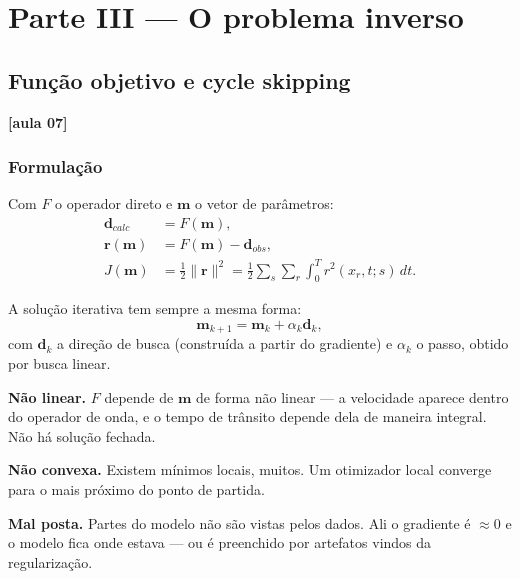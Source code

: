 \documentclass[11pt,a4paper,oneside]{report}
\newcommand{\aula}[1]{\textcolor{cianofwi}{\textbf{[aula #1]}}}
\begin{document}
\part*{\centering\color{azulfwi} Parte III --- O problema inverso}

\chapter{Função objetivo e cycle skipping}
\label{cap:inverso}

\aula{07}

\section{Formulação}

Com $F$ o operador direto e $\mathbf{m}$ o vetor de parâmetros:
\begin{align}
\mathbf{d}_{calc} &= F(\mathbf{m}), \\
\mathbf{r}(\mathbf{m}) &= F(\mathbf{m}) - \mathbf{d}_{obs}, \\
J(\mathbf{m}) &= \tfrac{1}{2}\|\mathbf{r}\|^{2}
 = \tfrac{1}{2}\sum_{s}\sum_{r}\int_{0}^{T} r^{2}(x_r,t;s)\,dt .
\end{align}

A solução iterativa tem sempre a mesma forma:
\begin{equation}
\mathbf{m}_{k+1} = \mathbf{m}_{k} + \alpha_k \mathbf{d}_k ,
\label{eq:iteracao}
\end{equation}
com $\mathbf{d}_k$ a direção de busca (construída a partir do gradiente) e
$\alpha_k$ o passo, obtido por busca linear.

\begin{teoria}
\textbf{Não linear.} $F$ depende de $\mathbf{m}$ de forma não linear --- a
velocidade aparece dentro do operador de onda, e o tempo de trânsito depende
dela de maneira integral. Não há solução fechada.

\textbf{Não convexa.} Existem mínimos locais, muitos. Um otimizador local
converge para o mais próximo do ponto de partida.

\textbf{Mal posta.} Partes do modelo não são vistas pelos dados. Ali o
gradiente é $\approx 0$ e o modelo fica onde estava --- ou é preenchido por
artefatos vindos da regularização.
\end{teoria}
\end{document}
